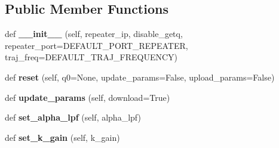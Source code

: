 \subsection*{Public Member Functions}
\begin{DoxyCompactItemize}
\item 
\mbox{\label{classrnb-planning_1_1src_1_1pkg_1_1controller_1_1repeater_1_1repeater_1_1_repeater_a66d4436b4e9f0cbe9e0d05ee3fccae3c}} 
def {\bfseries \+\_\+\+\_\+init\+\_\+\+\_\+} (self, repeater\+\_\+ip, disable\+\_\+getq, repeater\+\_\+port=D\+E\+F\+A\+U\+L\+T\+\_\+\+P\+O\+R\+T\+\_\+\+R\+E\+P\+E\+A\+T\+ER, traj\+\_\+freq=D\+E\+F\+A\+U\+L\+T\+\_\+\+T\+R\+A\+J\+\_\+\+F\+R\+E\+Q\+U\+E\+N\+CY)
\item 
\mbox{\label{classrnb-planning_1_1src_1_1pkg_1_1controller_1_1repeater_1_1repeater_1_1_repeater_a810a5a53dd0be1f212ef7e82eb99a1b0}} 
def {\bfseries reset} (self, q0=None, update\+\_\+params=False, upload\+\_\+params=False)
\item 
\mbox{\label{classrnb-planning_1_1src_1_1pkg_1_1controller_1_1repeater_1_1repeater_1_1_repeater_a8378ae7e70176119d4034a56c070a92c}} 
def {\bfseries update\+\_\+params} (self, download=True)
\item 
\mbox{\label{classrnb-planning_1_1src_1_1pkg_1_1controller_1_1repeater_1_1repeater_1_1_repeater_ac405aaeed7ca6d69b1e6a54b842f5521}} 
def {\bfseries set\+\_\+alpha\+\_\+lpf} (self, alpha\+\_\+lpf)
\item 
\mbox{\label{classrnb-planning_1_1src_1_1pkg_1_1controller_1_1repeater_1_1repeater_1_1_repeater_a8d35e8c3251316d4ce24cf7e41217ce0}} 
def {\bfseries set\+\_\+k\+\_\+gain} (self, k\+\_\+gain)
\item 
\mbox{\label{classrnb-planning_1_1src_1_1pkg_1_1controller_1_1repeater_1_1repeater_1_1_repeater_aa2d051fae9c68312ceb6f3bd78c9e70d}} 

\end{DoxyCompactItemize}
